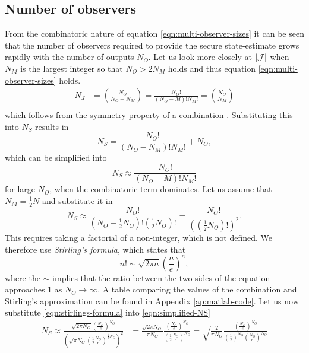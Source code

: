 \subsection{Number of observers}
From the combinatoric nature of equation \eqref{eqn:multi-observer-sizes} it can be seen that the number of observers required to provide the secure state-estimate grows rapidly with the number of outputs $N_O$. Let us look more closely at $|\mathcal{J}|$ when $N_M$ is the largest integer so that $N_O>2N_M$ holds and thus equation \eqref{eqn:multi-observer-sizes} holds.
\begin{equation*}
    \begin{split}
        N_J &= \binom{N_O}{N_O-N_M}  = \frac{N_O!}{(N_O-M)!N_M!} = \binom{N_O}{N_M} \\
    \end{split}
\end{equation*}
which follows from the symmetry property of a combination \cite[Section 1.1]{Mazur2010Combinatorics:Tour}. Substituting this into $N_S$ results in
\begin{equation*}
    N_S = \frac{N_O!}{(N_O-N_M)!N_M!} + N_O,
\end{equation*}
which can be simplified into
\begin{equation*}
    N_S \approx \frac{N_O!}{(N_O-M)!N_M!}
\end{equation*}
for large $N_O$, when the combinatoric term dominates. Let us assume that $N_M=\frac{1}{2}N$ and substitute it in
\begin{equation}\label{eqn:simplified-NS}
    N_S \approx \frac{N_O!}{(N_O-\frac{1}{2}N_O)!(\frac{1}{2}N_O)!} = \frac{N_O!}{\left( \left( \frac{1}{2}N_O \right) ! \right)^2}.
\end{equation}
This requires taking a factorial of a non-integer, which is not defined. We therefore use \textit{Stirling's formula}\cite{Beals2012GammaZeta}, which states that
\begin{equation}\label{eqn:stirlings-formula}
    n! \sim \sqrt{2\pi n} \left( \frac{n}{e} \right)^n,
\end{equation}
where the $\sim$ implies that the ratio between the two sides of the equation approaches $1$ as $N_O \rightarrow \infty$. A table comparing the values of the combination and Stirling's approximation can be found in Appendix \ref{ap:matlab-code}. Let us now substitute \eqref{eqn:stirlings-formula} into \eqref{eqn:simplified-NS}
\begin{equation*}
    \begin{split}
        N_S \approx  \frac{\sqrt{2 \pi N_O}( \frac{N_O}{e} )^{N_O}}{\left( \sqrt{\pi N_O}(\frac{1}{2} \frac{N_O}{e} )^{\frac{1}{2}N_O} \right)^2} &= \frac{\sqrt{2 \pi N_O}}{\pi N_O} \frac{( \frac{N_O}{e} )^{N_O}}{(\frac{1}{2} \frac{N_O}{e} )^{N_O}} = \sqrt{\frac{2}{\pi N_O}} \frac{( \frac{N_O}{e} )^{N_O}}{(\frac{1}{2})^{N_O} (\frac{N_O}{e} )^{N_O}} \\
    \end{split}
\end{equation*}
